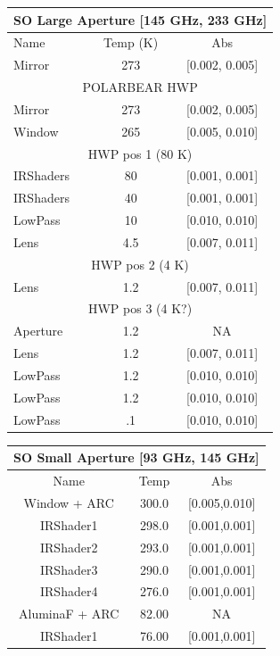 \documentclass{article}
\theoremstyle{remark}
\begin{document}
\begin{table}

\centering
\begin{tabular}{ |l|c|c|} 
	\hline
	\multicolumn{3}{|c|}{SO Large Aperture [145 GHz, 233 GHz]}\\
	\hline
	 Name 		& Temp (K)	& Abs 		\\ \hline
	 Mirror 	&	273		& [0.002, 0.005] 	\\
	 \hline \multicolumn{3}{|c|}{POLARBEAR HWP }	\\ \hline
	 Mirror 	&	273		& [0.002, 0.005]	\\
	 Window 	&	265		& [0.005, 0.010] 	 \\
	 \hline \multicolumn{3}{|c|}{HWP pos 1 (80 K)}	\\ \hline
	 IRShaders 	&	80		& [0.001, 0.001]	\\
	 IRShaders 	&	40		& [0.001, 0.001]	\\
	 LowPass 	&	10		& [0.010, 0.010] 	\\
	 Lens 		&	4.5		& [0.007, 0.011] 	 \\
	 \hline \multicolumn{3}{|c|}{HWP pos 2 (4 K)}	\\ \hline
	 Lens 		&	1.2		& [0.007, 0.011] 	 \\
	 \hline \multicolumn{3}{|c|}{HWP pos 3 (4 K?)}	\\ \hline
	 Aperture 	&	1.2		&  NA  			 	\\
	 Lens 		&	1.2		& [0.007, 0.011] 	 \\
	 LowPass 	&	1.2		& [0.010, 0.010] 	 \\
	 LowPass 	&	1.2		& [0.010, 0.010] 	 \\
	 LowPass 	&	.1		& [0.010, 0.010] 	 \\
	\hline	
\end{tabular}
\!
\begin{tabular}{|c|c|c|}
\hline
\multicolumn{3}{|c|}{SO Small Aperture [93 GHz, 145 GHz]}\\
\hline
Name & Temp & Abs \\
\hline
Window + ARC		& 300.0  & [0.005,0.010]	\\
IRShader1	& 298.0  & [0.001,0.001]	\\
IRShader2	& 293.0  & [0.001,0.001]	\\
IRShader3	& 290.0  & [0.001,0.001]	\\
IRShader4	& 276.0  & [0.001,0.001]	\\
AluminaF + ARC	& 82.00  &  NA			  	\\
IRShader1	& 76.00  & [0.001,0.001]	\\

\end{tabular}
\end{table}
\end{document}
